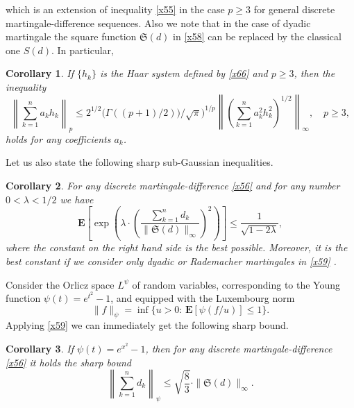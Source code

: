 \documentclass[12pt,reqno,fleqn]{amsart}
\newtheorem{corollary}{Corollary}[section]
\theoremstyle{definition}
\theoremstyle{definition}
\theoremstyle{remark}
\def\ZS{\ensuremath{\mathfrak S}}
\def\ZE{\ensuremath{\mathbf E}}
\numberwithin{equation}{section}
\newcommand {\e }[1]{\eqref{#1}}
\begin{document}
which is an extension of inequality \e{x55} in the case $p\ge 3$ for general discrete martingale-difference sequences. Also we note that in the case of dyadic martingale the square function $\ZS(d)$ in \e{x58} can be replaced by the classical one $S(d)$. In particular, 
\begin{corollary}\label{C2}
If $\{h_k\}$ is the Haar system defined by \e{x66} and $p\ge 3$, then the inequality 
\begin{equation}\label{x80}
	\left\|\sum_{k=1}^na_kh_k\right\|_p\le 2^{1/2}\big(\Gamma((p+1)/2))/\sqrt{\pi}\big)^{1/p}\left\|\left(\sum_{k=1}^na_k^2h_k^2\right)^{1/2}\right\|_\infty, \quad p\ge 3,
\end{equation}
holds for any coefficients $a_k$.
\end{corollary}
Let us also state the following sharp sub-Gaussian inequalities.
\begin{corollary}\label{C3}
	For any discrete martingale-difference \e{x56} and for any number $0<\lambda <1/2$ we have
	\begin{equation}\label{x59}
		\ZE\left[\exp\left(\lambda\cdot \left(\frac{\sum_{k=1}^nd_k}{\|\ZS(d)\|_\infty}\right)^2\right)\right]\le \frac{1}{\sqrt{1-2\lambda}},
	\end{equation} 
where the constant on the right hand side is the best possible. Moreover, it is the best constant if we consider only dyadic or Rademacher martingales in \e{x59} . 
\end{corollary}
Consider the Orlicz space $L^\psi$ of random variables, corresponding to the Young function $\psi(t)=e^{t^2}-1$, and equipped with the Luxembourg norm 
\begin{equation}
	\|f\|_\psi=\inf\{u>0:\, \ZE\left[\psi\left(f/u\right)\right]\le 1\}.
\end{equation}
Applying \e{x59} we can immediately get the following sharp bound.
\begin{corollary}\label{C4}
	If $\psi(t)=e^{x^2}-1$, then for any discrete martingale-difference \e{x56} it holds the sharp bound
	\begin{equation}\label{x60}
		\left\|\sum_{k=1}^nd_k\right\|_\psi \le \sqrt{\frac{8}{3}}\cdot \|\ZS(d)\|_\infty.
	\end{equation} 
\end{corollary}
\end{document}
